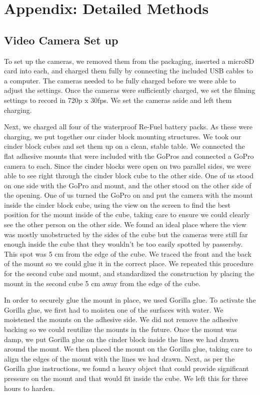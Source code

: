 \documentclass{article}
\begin{document}



\newpage
\section{Appendix: Detailed Methods}

\subsection{Video Camera Set up}

To set up the cameras, we removed them from the packaging, inserted a microSD card into each, and charged them fully by connecting the included USB cables to a computer. The cameras needed to be fully charged before we were able to adjust the settings. Once the cameras were sufficiently charged, we set the filming settings to record in 720p x 30fps. We set the cameras aside and left them charging. 

Next, we charged all four of the waterproof Re-Fuel battery packs. As these were charging, we put together our cinder block mounting structures. We took our cinder block cubes and set them up on a clean, stable table. We connected the flat adhesive mounts that were included with the GoPros and connected a GoPro camera to each. Since the cinder blocks were open on two parallel sides, we were able to see right through the cinder block cube to the other side. One of us stood on one side with the GoPro and mount, and the other stood on the other side of the opening. One of us turned the GoPro on and put the camera with the mount inside the cinder block cube, using the view on the screen to find the best position for the mount inside of the cube, taking care to ensure we could clearly see the other person on the other side. We found an ideal place where the view was mostly unobstructed by the sides of the cube but the cameras were still far enough inside the cube that they wouldn't be too easily spotted by passersby. This spot was 5 cm from the edge of the cube. We traced the front and the back of the mount so we could glue it in the correct place. We repeated this procedure for the second cube and mount, and standardized the construction by placing the mount in the second cube 5 cm away from the edge of the cube. 

In order to securely glue the mount in place, we used Gorilla glue. To activate the Gorilla glue, we first had to moisten one of the surfaces with water. We moistened the mounts on the adhesive side. We did not remove the adhesive backing so we could reutilize the mounts in the future. Once the mount was damp, we put Gorilla glue on the cinder block inside the lines we had drawn around the mount. We then placed the mount on the Gorilla glue, taking care to align the edges of the mount with the lines we had drawn. Next, as per the Gorilla glue instructions, we found a heavy object that could provide significant pressure on the mount and that would fit inside the cube. We left this for three hours to harden.
\end{document}
